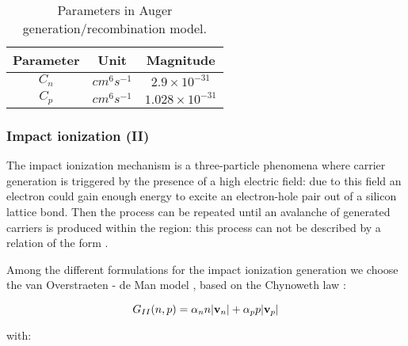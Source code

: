 \begin{table}[!h]
\centering
\begin{tabular}{ccc}
\toprule
Parameter & Unit & Magnitude \\
\midrule
$C_n$ & $cm^6s^{-1}$ & $2.9 \times 10^{-31}$ \\
$C_p$ & $cm^6s^{-1}$ & $1.028 \times 10^{-31}$ \\
\bottomrule
\end{tabular}
\caption{Parameters in Auger generation/recombination model.}
\end{table}

\subsubsection{Impact ionization (II)}
\label{sec: ImpactIonization}

The impact ionization mechanism is a three-particle phenomena where carrier generation is triggered by the presence of a high electric field: due to this field an electron could gain enough energy to excite an electron-hole pair out of a silicon lattice bond. Then the process can be repeated until an avalanche of generated carriers is produced within the region: this process can not be described  by a relation of the form . 

Among the different formulations for the impact ionization generation we choose the van Overstraeten - de Man model \cite{VanOverII}, based on the Chynoweth law \cite{Cynoweth}:

\begin{equation}
G_{II}(n,p)= \alpha_n n |\mathbf{v}_n| + \alpha_p p |\mathbf{v}_p|
\end{equation}

with:

